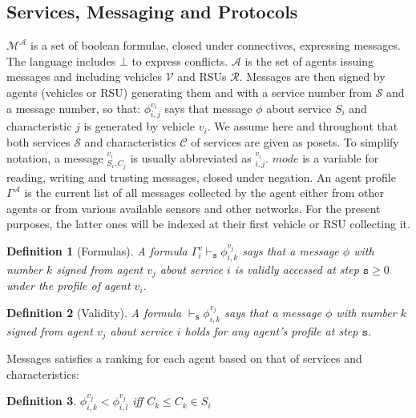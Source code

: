 \documentclass[compsoc, conference, letterpaper, 10pt, times]{IEEEtran}
\newtheorem{definition}{Definition}
\begin{document}
\subsection{Services, Messaging and Protocols}

$\mathcal{M^{\mathcal{A}}}$ is a set of boolean formulae, closed under connectives, expressing messages. The language includes $\bot$ to express conflicts. $\mathcal{A}$ is the set of agents issuing messages and including vehicles $\mathcal{V}$ and RSUs $\mathcal{R}$. Messages are then signed by agents (vehicles or RSU) generating them and with a service number from $\mathcal{S}$ and a message number, so that: $\phi^{v_{i}}_{i,j}$ says that message $\phi$ about service $S_{i}$ and characteristic $j$ is generated by vehicle $v_{i}$. We assume here and throughout that both services $\mathcal{S}$ and characteristics $\mathcal{C}$ of services are given as posets. To simplify notation, a message $^{v_{i}}_{S_{i},C_{j}}$ is usually abbreviated as $^{v_{i}}_{{i},{j}}$. $mode$ is a variable for reading, writing and trusting messages, closed under negation. An agent profile $\Gamma^{\mathcal{A}}$ is the current list of all messages collected by the agent either from other agents or from various available sensors and other networks. For the present purposes, the latter ones will be indexed at their first vehicle or RSU collecting it.


\begin{definition}[Formulas]
A formula $\Gamma^{v}_{i} \vdash_{\mathtt{s}} \phi^{v_{j}}_{i,k}$ says that a message $\phi$ with number $k$ signed from agent $v_{j}$ about service $i$ is validly accessed at step $\mathtt{s}\geq 0$ under the profile of agent $v_{i}$.
\end{definition}

\begin{definition}[Validity]
A formula $\vdash_{\mathtt{s}} \phi^{v_{j}}_{i,k}$ says that a message $\phi$ with number $k$ signed from agent $v_{j}$ about service $i$ holds for \textit{any} agent's profile at step $\mathtt{s}$.
\end{definition}


Messages satisfies a ranking for each agent based on that of services and characteristics:

\begin{definition}\label{def:dependencypackages}
$\phi^{v_{j}}_{i,k}<\phi^{v_{j}}_{i,l}$ iff $C_{k}\leq C_{k} \in S_{i}$ 
%
\end{definition}
\end{document}
